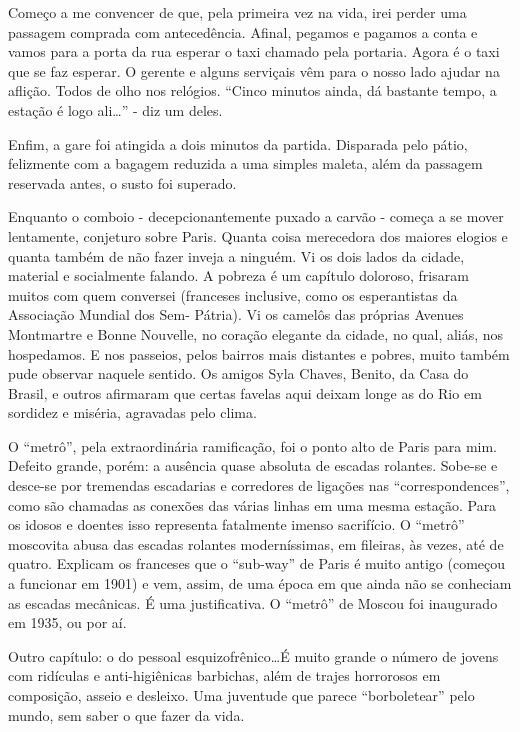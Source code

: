 Começo a me convencer de que, pela primeira vez na vida, irei perder uma passagem comprada com antecedência. Afinal, pegamos e pagamos a conta e vamos para a porta da rua esperar o taxi chamado pela portaria. Agora é o taxi que se faz esperar. O gerente e alguns serviçais vêm para o nosso lado ajudar na aflição. Todos de olho nos relógios. ``Cinco minutos ainda, dá bastante tempo, a estação é logo ali\ldots'' - diz um deles.

Enfim, a gare foi atingida a dois minutos da partida. Disparada pelo pátio, felizmente com a bagagem reduzida a uma simples maleta, além da passagem reservada antes, o susto foi superado.

Enquanto o comboio - decepcionantemente puxado a carvão - começa a se mover lentamente, conjeturo sobre Paris. Quanta coisa merecedora dos maiores elogios e quanta também de não fazer inveja a ninguém. Vi os dois lados da cidade, material e socialmente falando. A pobreza é um capítulo doloroso, frisaram muitos com quem conversei (franceses inclusive, como os esperantistas da Associação Mundial dos Sem- Pátria). Vi os camelôs das próprias Avenues Montmartre e Bonne Nouvelle, no coração elegante da cidade, no qual, aliás, nos hospedamos. E nos passeios, pelos bairros mais distantes e pobres, muito também pude observar naquele sentido. Os amigos Syla Chaves, Benito, da Casa do Brasil, e outros afirmaram que certas favelas aqui deixam longe as do Rio em sordidez e miséria, agravadas pelo clima.

O ``metrô'', pela extraordinária ramificação, foi o ponto alto de Paris para mim. Defeito grande, porém: a ausência quase absoluta de escadas rolantes. Sobe-se e desce-se por tremendas escadarias e corredores de ligações nas ``correspondences'', como são chamadas as conexões das várias linhas em uma mesma estação. Para os idosos e doentes isso representa fatalmente imenso sacrifício. O ``metrô'' moscovita abusa das escadas rolantes moderníssimas, em fileiras, às vezes, até de quatro. Explicam os franceses que o ``sub-way'' de Paris é muito antigo (começou a funcionar em 1901) e vem, assim, de uma época em que ainda não se conheciam as escadas mecânicas. É uma justificativa. O ``metrô'' de Moscou foi inaugurado em 1935, ou por aí.

Outro capítulo: o do pessoal esquizofrênico\ldots É muito grande o número de jovens com ridículas e anti-higiênicas barbichas, além de trajes horrorosos em composição, asseio e desleixo. Uma juventude que parece ``borboletear'' pelo mundo, sem saber o que fazer da vida.

